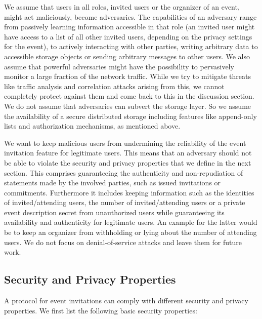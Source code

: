 We assume that users in all roles, \eg invited users or
the organizer of an event, might act maliciously, \ie become
adversaries. The capabilities of an adversary range from passively
learning information accessible in that role (\eg an invited
user might have access to a list of all other invited users, depending
on the privacy settings for the event), to actively interacting with
other parties, \eg writing arbitrary data to accessible storage
objects or sending arbitrary messages to other users. We also assume
that powerful adversaries might have the possibility to pervasively
monitor a large fraction of the network traffic. While we try to
mitigate threats like traffic analysis and correlation attacks arising
from this, we cannot completely protect against
them and come back to this in the discussion section. We do not assume
that adversaries can subvert the storage layer. So we
assume the availability of a secure distributed storage including
features like append-only lists and authorization mechanisms, as
mentioned above. %

We want to keep malicious users from undermining the reliability of the
event invitation feature for legitimate users. This means that an
adversary should not be able to violate the security and privacy
properties that we define in the next section. 
This comprises guaranteeing the authenticity and non-repudiation of
statements made by the involved parties, such as issued invitations or
commitments. 
Furthermore it includes keeping information such as the identities of
invited/attending users, the number of invited/attending users or a
private event description secret from unauthorized users while
guaranteeing its availability and authenticity for legitimate users.
An example for the latter would be to keep an organizer 
from withholding or lying about the number of attending users.
%
We do not focus on denial-of-service attacks and leave
them for future work.

\subsection{Security and Privacy Properties}
	\label{subsection:event-invitations-dosns:security-properties}
A protocol for event invitations can comply with different security and
privacy properties. We first list the following basic security properties:

